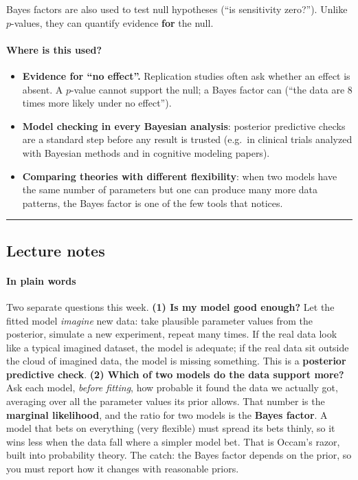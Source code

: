 Bayes factors are also used to test null hypotheses (``is sensitivity
zero?''). Unlike \(p\)-values, they can quantify evidence \textbf{for}
the null.

\paragraph{Where is this used?}

\begin{itemize}
\tightlist
\item
  \textbf{Evidence for ``no effect''.} Replication studies often ask
  whether an effect is absent. A \(p\)-value cannot support the null; a
  Bayes factor can (``the data are 8 times more likely under no
  effect'').
\item
  \textbf{Model checking in every Bayesian analysis}: posterior
  predictive checks are a standard step before any result is trusted
  (e.g.~in clinical trials analyzed with Bayesian methods and in
  cognitive modeling papers).
\item
  \textbf{Comparing theories with different flexibility}: when two
  models have the same number of parameters but one can produce many
  more data patterns, the Bayes factor is one of the few tools that
  notices.
\end{itemize}

\begin{center}\rule{0.5\linewidth}{0.5pt}\end{center}


\subsection{Lecture notes}

\paragraph{In plain words}

Two separate questions this week. \textbf{(1) Is my model good enough?}
Let the fitted model \emph{imagine} new data: take plausible parameter
values from the posterior, simulate a new experiment, repeat many times.
If the real data look like a typical imagined dataset, the model is
adequate; if the real data sit outside the cloud of imagined data, the
model is missing something. This is a \textbf{posterior predictive
check}. \textbf{(2) Which of two models do the data support more?} Ask
each model, \emph{before fitting}, how probable it found the data we
actually got, averaging over all the parameter values its prior allows.
That number is the \textbf{marginal likelihood}, and the ratio for two
models is the \textbf{Bayes factor}. A model that bets on everything
(very flexible) must spread its bets thinly, so it wins less when the
data fall where a simpler model bet. That is Occam's razor, built into
probability theory. The catch: the Bayes factor depends on the prior, so
you must report how it changes with reasonable priors.

